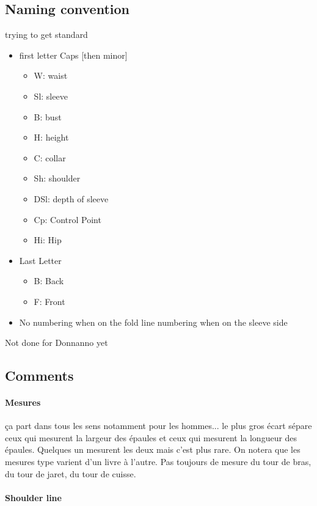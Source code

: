 \documentclass[11pt,a4paper]{article}
\begin{document}
\subsection{Naming convention}

trying to get standard
\begin{itemize}
\item		first letter Caps [then minor]
\begin{itemize}
\item		W: waist
\item		Sl: sleeve
\item		B: bust
\item		H: height
\item		C: collar
\item		Sh: shoulder
\item		DSl: depth of sleeve
\item		Cp: Control Point
\item		Hi: Hip
\end{itemize}
		
\item		Last Letter
\begin{itemize}
\item		B: Back
\item		F: Front
\end{itemize}
		
\item		No numbering when on the fold line numbering when on the sleeve side
\end{itemize}


Not done for Donnanno yet

\subsection{Comments}

\paragraph{Mesures}
ça part dans tous les sens notamment pour les hommes... le plus gros écart sépare ceux qui mesurent la largeur des épaules et ceux qui mesurent la longueur des épaules. Quelques un mesurent les deux mais c'est plus rare. On notera que les mesures type varient d'un livre à l'autre. Pas toujours de mesure du tour de bras, du tour de jaret, du tour de cuisse.

\paragraph{Shoulder line} 
\end{document}
